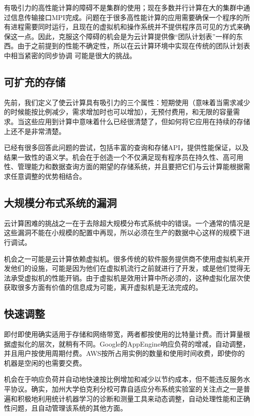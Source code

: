有吸引力的高性能计算的障碍不是集群的使用；现在多数并行计算在大的集群中通过信息传输接口MPI完成。问题在于很多高性能计算的应用需要确保一个程序的所有进程需要同时运行，且现在的虚拟机和操作系统并不提供程序员可见的方式来确保这一点。因此，克服这个障碍的机会是为云计算提供像“团队计划表”一样的东西。由于之前提到的性能不确定性，所以在云计算环境中实现在传统的团队计划表中相当紧密的同步协调 可能是很大的挑战。

\subsection{可扩充的存储}

先前，我们定义了使云计算具有吸引力的三个属性：短期使用（意味着当需求减少的时候能按比例减少，需求增加时也可以增加），无预付费用，和无限的容量需求。当这些应用到计算中意味着什么已经很清楚了，但如何将它应用在持续的存储上还不是非常清楚。

已经有很多回答此问题的尝试，包括丰富的查询和存储API，提供性能保证，以及结果一致性的语义学。机会在于创造一个不仅满足现有程序员在持久性、高可用性、管理能力和数据查询方面的期望的存储系统，并且要把它们与云计算能根据需求任意调整的优势相结合。

\subsection{大规模分布式系统的漏洞}

云计算困难的挑战之一在于去除超大规模分布式系统中的错误。一个通常的情况是这些漏洞不能在小规模的配置中再现，所以必须在生产的数据中心这样的规模下进行调试。

机会之一可能是云计算依赖虚拟机。很多传统的软件服务提供商不使用虚拟机来开发他们的设施，可能是因为他们在虚拟机流行之前就进行了开发，或是他们觉得无法承受虚拟机的性能开销。由于虚拟机是效用计算中所必须的，这种虚拟化层次使获取很多方面有价值的信息成为可能，离开虚拟机是无法完成的。

\subsection{快速调整}

即付即使用确实适用于存储和网络带宽，两者都按使用的比特量计费。而计算量根据虚拟化的层次，就稍有不同。Google的AppEngine响应负荷的增减，自动调整，并且用户按使用周期付费。AWS按所占用实例的数量和使用时间收费，即使你的机器是空闲的也需要交费。

机会在于响应负荷并自动地快速按比例增加和减少以节约成本，但不能违反服务水平协议。确实，加州大学伯克利分校可靠自适应分布系统实验室的关注点之一是普遍和积极地利用统计机器学习的诊断和测量工具来动态调整，自动处理性能和正确性问题，且自动管理该系统的其他方面。

